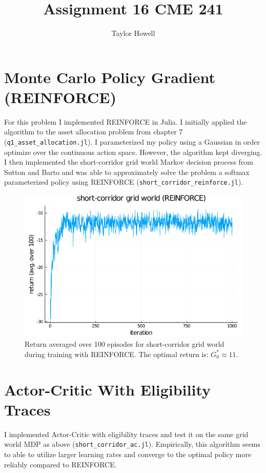 \documentclass[12pt]{article}
\title{\textbf{Assignment 16 CME 241}}
\author{Taylor Howell}
\begin{document}
\maketitle

\newpage

\section{Monte Carlo Policy Gradient (REINFORCE)}
For this problem I implemented REINFORCE in Julia. I initially applied the algorithm to the asset allocation problem from chapter 7 (\texttt{q1\_asset\_allocation.jl}). I parameterized my policy using a Gaussian in order optimize over the continuous action space. However, the algorithm kept diverging. I then implemented the short-corridor grid world Markov decision process from Sutton and Barto and was able to approximately solve the problem a softmax parameterized policy using REINFORCE (\texttt{short\_corridor\_reinforce.jl}).

\begin{figure}[H]
	\centering
	\includegraphics[width=.75\textwidth]{figures/sc_gw_reinforce.png}
	\caption{Return averaged over 100 episodes for short-corridor grid world during training with REINFORCE. The optimal return is: $G_0^* \approx 11$.}
	\label{}
\end{figure}

\section{Actor-Critic With Eligibility Traces}
I implemented Actor-Critic with eligibility traces and test it on the same grid world MDP as above (\texttt{short\_corridor\_ac.jl}). Empirically, this algorithm seems to able to utilize larger learning rates and converge to the optimal policy more reliably compared to REINFORCE.
\end{document}
